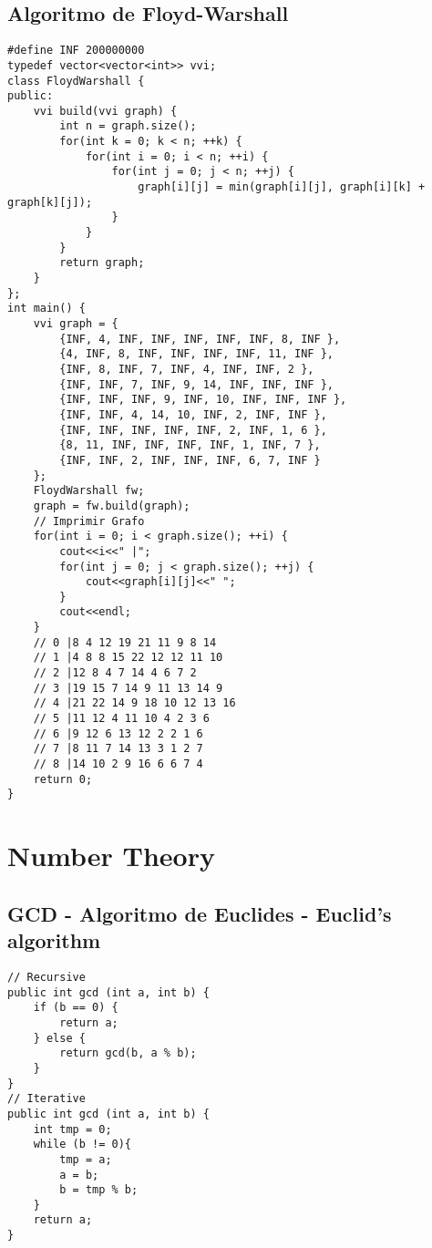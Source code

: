 \documentclass[10pt,letterpaper,twocolumn,twosided]{article}
\begin{document}
\subsection{Algoritmo de Floyd-Warshall}
\begin{lstlisting}
#define INF 200000000
typedef vector<vector<int>> vvi;
class FloydWarshall {
public:
    vvi build(vvi graph) {
        int n = graph.size();
        for(int k = 0; k < n; ++k) {
            for(int i = 0; i < n; ++i) {
                for(int j = 0; j < n; ++j) {
                    graph[i][j] = min(graph[i][j], graph[i][k] + graph[k][j]);
                }
            }
        }
        return graph;
    }
};
int main() {
    vvi graph = {
        {INF, 4, INF, INF, INF, INF, INF, 8, INF },
        {4, INF, 8, INF, INF, INF, INF, 11, INF },
        {INF, 8, INF, 7, INF, 4, INF, INF, 2 },
        {INF, INF, 7, INF, 9, 14, INF, INF, INF },
        {INF, INF, INF, 9, INF, 10, INF, INF, INF },
        {INF, INF, 4, 14, 10, INF, 2, INF, INF },
        {INF, INF, INF, INF, INF, 2, INF, 1, 6 },
        {8, 11, INF, INF, INF, INF, 1, INF, 7 },
        {INF, INF, 2, INF, INF, INF, 6, 7, INF }
    };
    FloydWarshall fw;
    graph = fw.build(graph);
    // Imprimir Grafo
    for(int i = 0; i < graph.size(); ++i) {
        cout<<i<<" |";
        for(int j = 0; j < graph.size(); ++j) {
            cout<<graph[i][j]<<" ";
        }
        cout<<endl;
    }
    // 0 |8 4 12 19 21 11 9 8 14 
    // 1 |4 8 8 15 22 12 12 11 10 
    // 2 |12 8 4 7 14 4 6 7 2 
    // 3 |19 15 7 14 9 11 13 14 9 
    // 4 |21 22 14 9 18 10 12 13 16 
    // 5 |11 12 4 11 10 4 2 3 6 
    // 6 |9 12 6 13 12 2 2 1 6 
    // 7 |8 11 7 14 13 3 1 2 7 
    // 8 |14 10 2 9 16 6 6 7 4 
    return 0;
}
\end{lstlisting}




\section{Number Theory}

\subsection{GCD - Algoritmo de Euclides - Euclid's algorithm}
\begin{lstlisting}
// Recursive
public int gcd (int a, int b) {
    if (b == 0) {
        return a;
    } else {
        return gcd(b, a % b);
    }
}
// Iterative
public int gcd (int a, int b) {
    int tmp = 0;
    while (b != 0){
        tmp = a;
        a = b;
        b = tmp % b;
    }
    return a;
}
\end{lstlisting}
\end{document}
